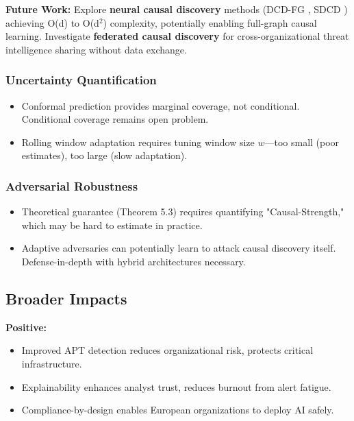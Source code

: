 \documentclass[conference]{IEEEtran}
\begin{document}
\textbf{Future Work:} Explore \textbf{neural causal discovery} methods (DCD-FG \cite{dcdfg2022}, SDCD \cite{sdcd2024}) achieving O(d) to O(d$^2$) complexity, potentially enabling full-graph causal learning. Investigate \textbf{federated causal discovery} for cross-organizational threat intelligence sharing without data exchange.

\subsubsection{Uncertainty Quantification}

\begin{itemize}
    \item Conformal prediction provides marginal coverage, not conditional. Conditional coverage remains open problem.
    \item Rolling window adaptation requires tuning window size $w$—too small (poor estimates), too large (slow adaptation).
\end{itemize}

\subsubsection{Adversarial Robustness}

\begin{itemize}
    \item Theoretical guarantee (Theorem 5.3) requires quantifying "Causal-Strength," which may be hard to estimate in practice.
    \item Adaptive adversaries can potentially learn to attack causal discovery itself. Defense-in-depth with hybrid architectures necessary.
\end{itemize}

\subsection{Broader Impacts}

\textbf{Positive:}
\begin{itemize}
    \item Improved APT detection reduces organizational risk, protects critical infrastructure.
    \item Explainability enhances analyst trust, reduces burnout from alert fatigue.
    \item Compliance-by-design enables European organizations to deploy AI safely.
\end{itemize}
\end{document}

